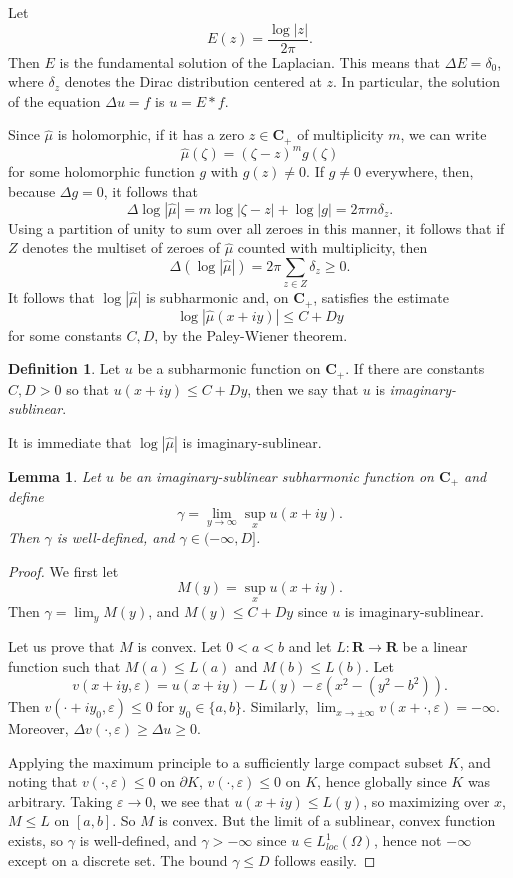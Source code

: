 \documentclass[12pt]{report}
\newcommand{\RR}{\mathbf{R}}
\newcommand{\CC}{\mathbf{C}}
\newcommand{\dfn}[1]{\emph{#1}\index{#1}}
\newtheorem{lemma}[theorem]{Lemma}
\theoremstyle{definition}
\newtheorem{definition}[theorem]{Definition}
\theoremstyle{remark}
\begin{document}
Let
$$E(z) = \frac{\log |z|}{2\pi}.$$
Then $E$ is the fundamental solution of the Laplacian. This means that $\Delta E = \delta_0$, where $\delta_z$ denotes the Dirac distribution centered at $z$. In particular, the solution of the equation $\Delta u = f$ is $u = E*f$.

Since $\hat \mu$ is holomorphic, if it has a zero $z \in \CC_+$ of multiplicity $m$, we can write
$$\hat \mu(\zeta) = (\zeta - z)^m g(\zeta)$$
for some holomorphic function $g$ with $g(z) \neq 0$. If $g \neq 0$ everywhere, then, because $\Delta g = 0$, it follows that
$$\Delta \log |\hat \mu| = m\log |\zeta - z| + \log |g| = 2\pi m \delta_z.$$
Using a partition of unity to sum over all zeroes in this manner, it follows that if $Z$ denotes the multiset of zeroes of $\hat \mu$ counted with multiplicity, then
$$\Delta(\log |\hat \mu|) = 2\pi \sum_{z \in Z} \delta_z \geq 0.$$
It follows that $\log |\hat \mu|$ is subharmonic and, on $\CC_+$, satisfies the estimate
$$\log |\hat \mu(x + iy)| \leq C + Dy$$
for some constants $C, D$, by the Paley-Wiener theorem.

\begin{definition}
    Let $u$ be a subharmonic function on $\CC_+$. If there are constants $C, D > 0$ so that $u(x + iy) \leq C + Dy$, then we say that $u$ is \dfn{imaginary-sublinear}.
\end{definition}
It is immediate that $\log |\hat \mu|$ is imaginary-sublinear.

\begin{lemma}
    \label{imaginary sublinear limit}
    Let $u$ be an imaginary-sublinear subharmonic function on $\CC_+$ and define
    $$\gamma = \lim_{y \to \infty} \sup_x u(x + iy).$$
    Then $\gamma$ is well-defined, and $\gamma \in (-\infty, D]$.
\end{lemma}
\begin{proof}
    We first let
    $$M(y) = \sup_x u(x + iy).$$
    Then $\gamma = \lim_y M(y)$, and $M(y) \leq C + Dy$ since $u$ is imaginary-sublinear.

    Let us prove that $M$ is convex. Let $0 < a < b$ and let $L: \RR \to \RR$ be a linear function such that $M(a) \leq L(a)$ and $M(b) \leq L(b)$. Let
    $$v(x + iy, \varepsilon) = u(x + iy) - L(y) - \varepsilon(x^2 - (y^2 - b^2)).$$
    Then $v(\cdot + iy_0, \varepsilon) \leq 0$ for $y_0 \in \{a, b\}$. Similarly, $\lim_{x \to \pm \infty} v(x + \cdot, \varepsilon) = -\infty$. Moreover, $\Delta v(\cdot, \varepsilon) \geq \Delta u \geq 0$.

    Applying the maximum principle to a sufficiently large compact subset $K$, and noting that $v(\cdot, \varepsilon) \leq 0$ on $\partial K$, $v(\cdot, \varepsilon) \leq 0$ on $K$, hence globally since $K$ was arbitrary. Taking $\varepsilon \to 0$, we see that $u(x + iy) \leq L(y)$, so maximizing over $x$, $M \leq L$ on $[a, b]$. So $M$ is convex. But the limit of a sublinear, convex function exists, so $\gamma$ is well-defined, and $\gamma > -\infty$ since $u \in L^1_{loc}(\Omega)$, hence not $-\infty$ except on a discrete set. The bound $\gamma \leq D$ follows easily.
\end{proof}
\end{document}
